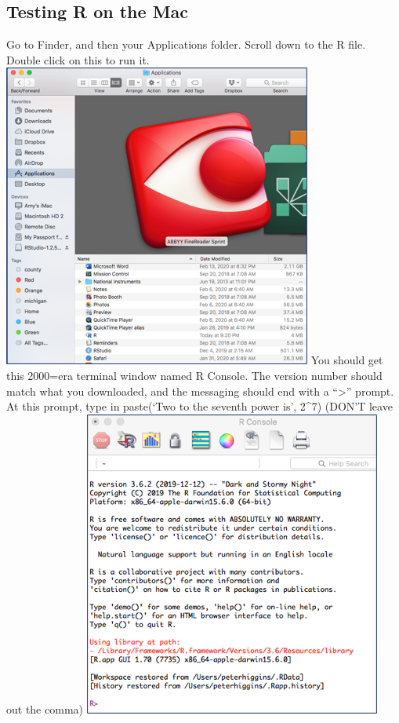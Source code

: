 \documentclass[
]{book}
\begin{document}
\hypertarget{testing-r-on-the-mac}{%
\subsection{Testing R on the Mac}\label{testing-r-on-the-mac}}

Go to Finder, and then your Applications folder. Scroll down to the R file. Double click on this to run it.
\includegraphics{images/findrmac.png}
You should get this 2000=era terminal window named R Console. The version number should match what you downloaded, and the messaging should end with a ``\textgreater{}'' prompt.
At this prompt, type in
paste(`Two to the seventh power is', 2\^{}7)
(DON'T leave out the comma)
\includegraphics{images/rconsolemac.png}
\end{document}

